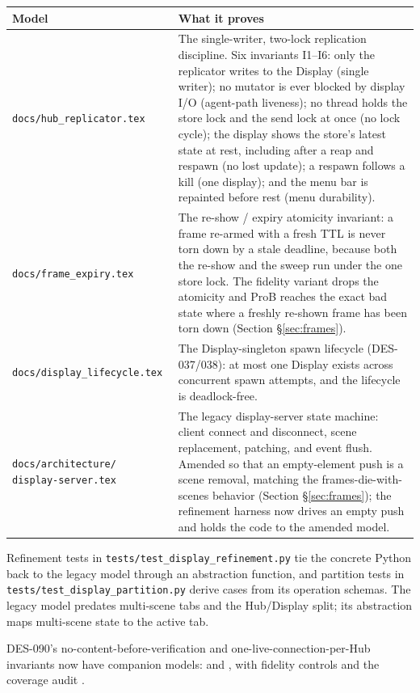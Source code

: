 \documentclass[a4paper,10pt]{article}
\begin{document}
\begin{center}
\begin{tabular}{p{4.3cm}p{9cm}}
\toprule
\textbf{Model} & \textbf{What it proves} \\
\midrule
\texttt{docs/hub\_replicator.tex} & The single-writer, two-lock replication
  discipline.  Six invariants I1--I6: only the replicator writes to the
  Display (single writer); no mutator is ever blocked by display I/O
  (agent-path liveness); no thread holds the store lock and the send lock
  at once (no lock cycle); the display shows the store's latest state at
  rest, including after a reap and respawn (no lost update); a respawn
  follows a kill (one display); and the menu bar is repainted before rest
  (menu durability). \\
\texttt{docs/frame\_expiry.tex} & The re-show / expiry atomicity invariant:
  a frame re-armed with a fresh TTL is never torn down by a stale deadline,
  because both the re-show and the sweep run under the one store lock.  The
  fidelity variant drops the atomicity and ProB reaches the exact bad state
  where a freshly re-shown frame has been torn down (Section
  \S\ref{sec:frames}). \\
\texttt{docs/display\_lifecycle.tex} & The Display-singleton spawn
  lifecycle (DES-037/038): at most one Display exists across concurrent
  spawn attempts, and the lifecycle is deadlock-free. \\
\texttt{docs/architecture/ display-server.tex} & The legacy display-server
  state machine: client connect and disconnect, scene replacement,
  patching, and event flush.  Amended so that an empty-element push is a
  scene removal, matching the frames-die-with-scenes behavior (Section
  \S\ref{sec:frames}); the refinement harness now drives an empty push and
  holds the code to the amended model. \\
\bottomrule
\end{tabular}
\end{center}

Refinement tests in \texttt{tests/test\_display\_refinement.py} tie the
concrete Python back to the legacy model through an abstraction function,
and partition tests in \texttt{tests/test\_display\_partition.py} derive
cases from its operation schemas.  The legacy model predates multi-scene
tabs and the Hub/Display split; its abstraction maps multi-scene state to
the active tab.

DES-090's no-content-before-verification and one-live-connection-per-Hub
invariants now have companion models:
 and
, with fidelity controls and the
coverage audit .
\end{document}
